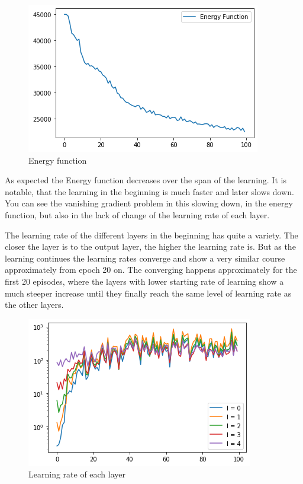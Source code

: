 \documentclass[12pt,A4]{article}
\begin{document}
\parindent=0cm

\begin{figure}
\includegraphics[scale=0.7]{hw3-2-graph1.png}
\begin{center}
\end{center}
\caption{Energy function\label{fig}}
\end{figure}
As expected the Energy function decreases over the span of the learning.  It is notable, that the learning in the beginning is much faster and later slows down. You can see the vanishing gradient problem in this slowing down, in the energy function, but also in the lack of change of the learning rate of each layer.

The learning rate of the different layers in the beginning has quite a variety. The closer the layer is to the output layer, the higher the learning rate is. But as the learning continues the learning rates converge and show a very similar course approximately from epoch 20  on.
The converging happens approximately for the first 20 episodes, where the layers with lower starting rate of learning show a much steeper increase until they finally reach the same level of learning rate as the other layers. 
\begin{figure}
\includegraphics[scale=0.7]{hw3-2-graph2.png}
\begin{center}
\end{center}
\caption{Learning rate of each layer\label{tab}}
\end{figure}
\end{document}
